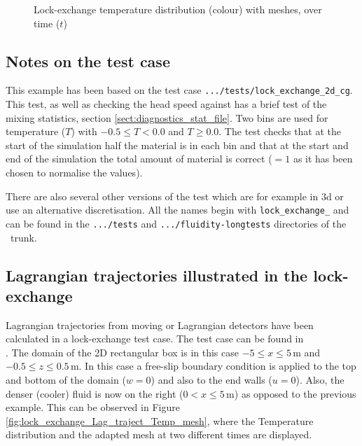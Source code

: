 \begin{figure}[ht]
  \centering
  \caption{Lock-exchange temperature distribution (colour) with meshes, over time ($t$)}
  \label{fig:lock_exchange}
\end{figure}

\subsection{Notes on the test case}
This example has been based on the test case \lstinline[language=bash]+.../tests/lock_exchange_2d_cg+. This test, as well as checking the head speed against \cite{hartel_00} has a brief test of the mixing statistics, section \ref{sect:diagnostics_stat_file}. Two bins are used for temperature ($T$) with $-0.5\leq T<0.0$ and $T\geq 0.0$. The test checks that at the start of the simulation half the material is in each bin and that at the start and end of the simulation the total amount of material is correct ($=1$ as it has been chosen to normalise the values). 

There are also several other versions of the test which are for example in 3d or use an alternative discretisation. All the names begin with \lstinline[language=bash]+lock_exchange_+ and can be found in the \lstinline[language=bash]+.../tests+ and \lstinline[language=bash]+.../fluidity-longtests+ directories of the \fluidity\ trunk.

\subsection{Lagrangian trajectories illustrated in the lock-exchange}
\label{sect:lock_exchange_Lagrangian_trajectories}
Lagrangian trajectories from moving or Lagrangian detectors have been calculated in a lock-exchange test case. The test case can be found in  \\ . The domain of the 2D rectangular box is in this case $-5\leq x \leq 5\,$m and $-0.5 \leq z \leq 0.5\,$m. In this case a free-slip boundary condition is applied to the top and bottom of the domain ($w = 0$) and also to the end walls ($u = 0$).
Also, the denser (cooler) fluid is now on the right ($0<x \leq 5\,$m) as opposed to the previous example. This can be observed in Figure \ref{fig:lock_exchange_Lag_traject_Temp_mesh}, where the Temperature distribution and the adapted mesh at two different times are displayed.

